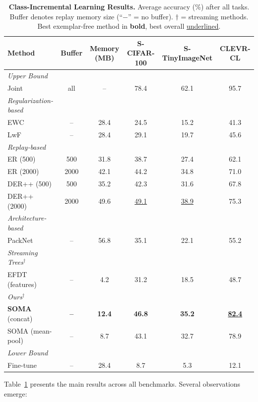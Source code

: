 \documentclass{article}
\begin{document}
\begin{table}[t]
\centering
\caption{\textbf{Class-Incremental Learning Results.} Average accuracy (\%) after all tasks. Buffer denotes replay memory size (``$-$'' = no buffer). $\dagger$ = streaming methods. Best exemplar-free method in \textbf{bold}, best overall \underline{underlined}.}
\label{tab:main}
\vspace{0.5em}
\begin{tabular}{lccccc}
\toprule
\textbf{Method} & \textbf{Buffer} & \textbf{Memory (MB)} & \textbf{S-CIFAR-100} & \textbf{S-TinyImageNet} & \textbf{CLEVR-CL} \\
\midrule
\textit{Upper Bound} \\
\quad Joint & all & -- & 78.4 & 62.1 & 95.7 \\
\midrule
\textit{Regularization-based} \\
\quad EWC & -- & 28.4 & 24.5 & 15.2 & 41.3 \\
\quad LwF & -- & 28.4 & 29.1 & 19.7 & 45.6 \\
\midrule
\textit{Replay-based} \\
\quad ER (500) & 500 & 31.8 & 38.7 & 27.4 & 62.1 \\
\quad ER (2000) & 2000 & 42.1 & 44.2 & 34.8 & 71.0 \\
\quad DER++ (500) & 500 & 35.2 & 42.3 & 31.6 & 67.8 \\
\quad DER++ (2000) & 2000 & 49.6 & \underline{49.1} & \underline{38.9} & 75.3 \\
\midrule
\textit{Architecture-based} \\
\quad PackNet & -- & 56.8 & 35.1 & 22.1 & 55.2 \\
\midrule
\textit{Streaming Trees}$^\dagger$ \\
\quad EFDT (features) & -- & 4.2 & 31.2 & 18.5 & 48.7 \\
\midrule
\textit{Ours}$^\dagger$ \\
\quad \textbf{SOMA} (concat) & \textbf{--} & \textbf{12.4} & \textbf{46.8} & \textbf{35.2} & \underline{\textbf{82.4}} \\
\quad SOMA (mean-pool) & -- & 8.7 & 43.1 & 32.7 & 78.9 \\
\midrule
\textit{Lower Bound} \\
\quad Fine-tune & -- & 28.4 & 8.7 & 5.3 & 12.1 \\
\bottomrule
\end{tabular}
\end{table}


Table~\ref{tab:main} presents the main results across all benchmarks.
Several observations emerge:
\end{document}
